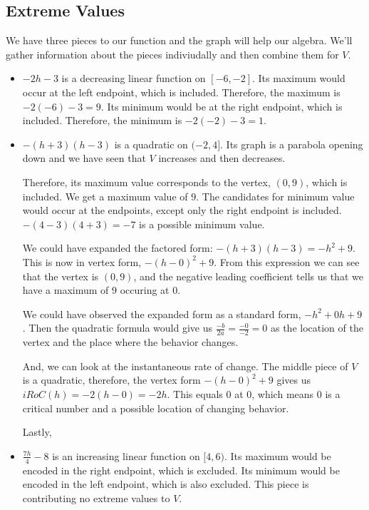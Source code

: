 \documentclass{ximera}
\begin{document}
\subsection*{Extreme Values} 


We have three pieces to our function and the graph will help our algebra. We'll gather information about the pieces indiviudally and then combine them for $V$.

\begin{itemize}
  \item \textbf{$-2h-3$} is a decreasing linear function on $[-6, -2]$.  Its maximum would occur at the left endpoint, which is included. Therefore, the maximum is $-2(-6)-3 = 9$. Its minimum would be at the right endpoint, which is included. Therefore, the minimum is $-2(-2)-3 = 1$.

  \item \textbf{$-(h+3)(h-3)$} is a quadratic on $(-2, 4]$.  Its graph is a parabola opening down and we have seen that $V$ increases and then decreases.  

  Therefore, its maximum value corresponds to the vertex, $(0, 9)$, which is included.  We get a maximum value of $9$.  The candidates for minimum value would occur at the endpoints, except only the right endpoint is included.  $-(4-3)(4+3) = -7$ is a possible minimum value.


\begin{observation}


We could have expanded the factored form: $-(h+3)(h-3) = -h^2 + 9$.  This is now in vertex form, $-(h-0)^2 + 9$. From this expression we can see that the vertex is $(0, 9)$, and the negative leading coefficient tells us that we have a maximum of $9$ occuring at $0$.


We could have observed the expanded form as a standard form, $-h^2 + 0 h + 9$.  Then the quadratic formula would give us $\frac{-b}{2a} = \frac{-0}{-2} = 0$ as the location of the vertex and the place where the behavior changes.


And, we can look at the instantaneous rate of change. The middle piece of $V$ is a quadratic, therefore, the vertex form $-(h-0)^2 + 9$ gives us $iRoC(h) = -2(h-0) = -2h$.  This equals $0$ at $0$, which means $0$ is a critical number and a possible location of changing behavior.

\end{observation}
Lastly, \\


  \item \textbf{$\frac{7h}{4} - 8$} is an increasing linear function on $[4, 6)$.  Its maximum would be encoded in the right endpoint, which is excluded. Its minimum would be encoded in the left endpoint, which is also excluded. This piece is contributing no extreme values to $V$.
\end{itemize}
\end{document}
